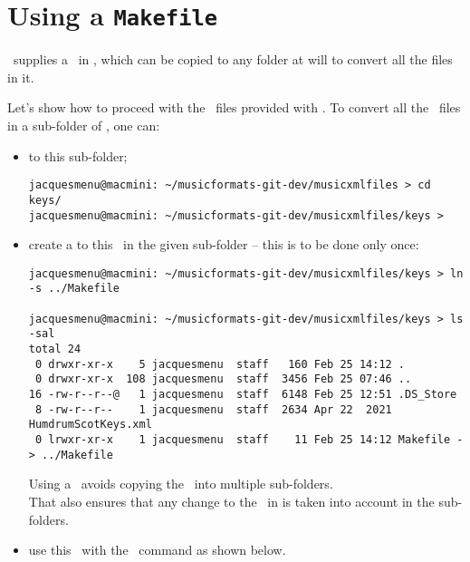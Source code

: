 \section{Using a {\tt Makefile}}

\mf\ supplies a \Makefile\ in , which can be copied to any folder at will to convert all the  files in it.

Let's show how to proceed with the \mxml\ files provided with \mf.
To convert all the \mxml\ files in a sub-folder of , one can:
\begin{itemize}
\item {} to this sub-folder;
\begin{lstlisting}[language=Terminal]
jacquesmenu@macmini: ~/musicformats-git-dev/musicxmlfiles > cd keys/
jacquesmenu@macmini: ~/musicformats-git-dev/musicxmlfiles/keys >
\end{lstlisting}

\item create a {\it \symbolicLink} to this \Makefile\ in the given sub-folder -- this is to be done only once:
\begin{lstlisting}[language=Terminal]
jacquesmenu@macmini: ~/musicformats-git-dev/musicxmlfiles/keys > ln -s ../Makefile

jacquesmenu@macmini: ~/musicformats-git-dev/musicxmlfiles/keys > ls -sal
total 24
 0 drwxr-xr-x    5 jacquesmenu  staff   160 Feb 25 14:12 .
 0 drwxr-xr-x  108 jacquesmenu  staff  3456 Feb 25 07:46 ..
16 -rw-r--r--@   1 jacquesmenu  staff  6148 Feb 25 12:51 .DS_Store
 8 -rw-r--r--    1 jacquesmenu  staff  2634 Apr 22  2021 HumdrumScotKeys.xml
 0 lrwxr-xr-x    1 jacquesmenu  staff    11 Feb 25 14:12 Makefile -> ../Makefile
\end{lstlisting}

Using a \symbolicLink\ avoids copying the \Makefile\ into multiple sub-folders. \\
That also ensures that any change to the \Makefile\ in  is taken into account in the sub-folders.

\item use this \Makefile\ with the \make\ command as shown below. 
\end{itemize}

